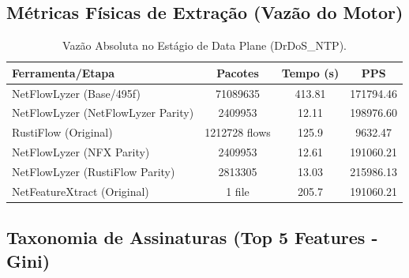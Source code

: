 \documentclass[11pt,a4paper]{article}
\begin{document}
\subsection{Métricas Físicas de Extração (Vazão do Motor)}
\begin{table}[H]
\centering
\begin{threeparttable}
\begin{tabular}{lccc}
\toprule
\textbf{Ferramenta/Etapa} & \textbf{Pacotes} & \textbf{Tempo (s)} & \textbf{PPS} \\
\midrule
NetFlowLyzer (Base/495f) & 71089635 & 413.81 & 171794.46 \\
NetFlowLyzer (NetFlowLyzer Parity) & 2409953 & 12.11 & 198976.60 \\
RustiFlow (Original) & 1212728 flows & 125.9 & 9632.47 \\
NetFlowLyzer (NFX Parity) & 2409953 & 12.61 & 191060.21 \\
NetFlowLyzer (RustiFlow Parity) & 2813305 & 13.03 & 215986.13 \\
NetFeatureXtract (Original) & 1 file & 205.7 & 191060.21 \\
\bottomrule
\end{tabular}
\end{threeparttable}
\caption{Vazão Absoluta no Estágio de Data Plane (DrDoS\_NTP).}
\end{table}

\subsection{Taxonomia de Assinaturas (Top 5 Features - Gini)}
\begin{table}[H]
\centering
{}
\caption{Principais atributos de correlação estocástica por limiar dimensional (DrDoS\_NTP).}
\end{table}
\end{document}

